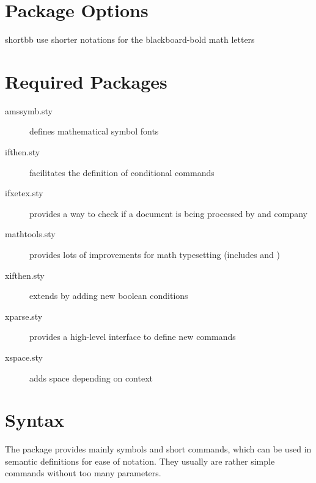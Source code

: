 \documentclass[english,a4paper,DIV=12,parskip=full,oneside]{scrartcl}
\begin{document}
    \section{Package Options}
        \label{sec:package-options}
        \begin{commandlist}
            \item[shortbb] use shorter notations for the blackboard-bold math letters \codeCommand{\C, \K, \N, \Q, \R, \Z}
        \end{commandlist}

    \section{Required Packages}
        \label{sec:required-packages}
        \begin{description}
            \item[amssymb.sty] defines mathematical symbol fonts
            \item[ifthen.sty] facilitates the definition of conditional commands
            \item[ifxetex.sty] provides a way to check if a document is being processed by \XeTeX{} and company
            \item[mathtools.sty] provides lots of improvements for math typesetting (includes  and )
            \item[xifthen.sty] extends  by adding new boolean conditions
            \item[xparse.sty] provides a high-level interface to define new commands
            \item[xspace.sty] adds space depending on context
        \end{description}


    \section{Syntax}
        \label{sec:syntax}

    The  package provides mainly symbols and short commands, which can be used in semantic definitions for ease of notation.
    They usually are rather simple commands without too many parameters.
\end{document}
